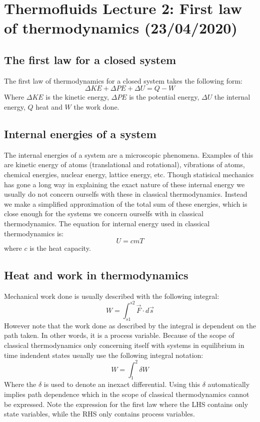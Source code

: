 \documentclass[11pt, a4paper]{article}
\begin{document}
\setcounter{section}{1}
\setcounter{equation}{0}

\section{Thermofluids Lecture 2: First law of thermodynamics (23/04/2020)}


\subsection{The first law for a closed system}
The first law of thermodynamics for a closed system takes the following form:
\begin{equation}
  \Delta KE + \Delta PE + \Delta U = Q - W
\end{equation}
Where $\Delta KE$ is the kinetic energy, $\Delta PE$ is the potential energy, $\Delta U$ the internal energy, $Q$ heat and $W$ the work done.


\subsection{Internal energies of a system}
The internal energies of a system are a microscopic phenomena. Examples of this are kinetic energy of atoms (translational and rotational), vibrations of atoms, chemical energies, nuclear energy, lattice energy, etc. Though statisical mechanics has gone a long way in explaining the exact nature of these internal energy we usually do not concern ourselfs with these in classical thermodynamics. Instead we make a simplified approximation of the total sum of these energies, which is close enough for the systems we concern ourselfs with in classical thermodynamics. The equation for internal energy used in classical thermodynamics is:
\begin{equation}
  U = cmT
\end{equation}
where $c$ is the heat capacity.


\subsection{Heat and work in thermodynamics}
Mechanical work done is usually described with the following integral:
\begin{equation}
  W = \int_{s1}^{s2} \vec{F}\cdot d\vec{s}
\end{equation}
However note that the work done as described by the integral is dependent on the path taken. In other words, it is a process variable. Because of the scope of classical thermodynamics only concerning itself with systems in equilibrium in time indendent states usually use the following integral notation:
\begin{equation}
  W = \int_1^2 \delta W
\end{equation}
Where the $\delta$ is used to denote an inexact differential. Using this $\delta$ automatically implies path dependence which in the scope of classical thermodynamics cannot be expressed. Note the expression for the first law where the LHS contains only state variables, while the RHS only contains process variables.
\end{document}
